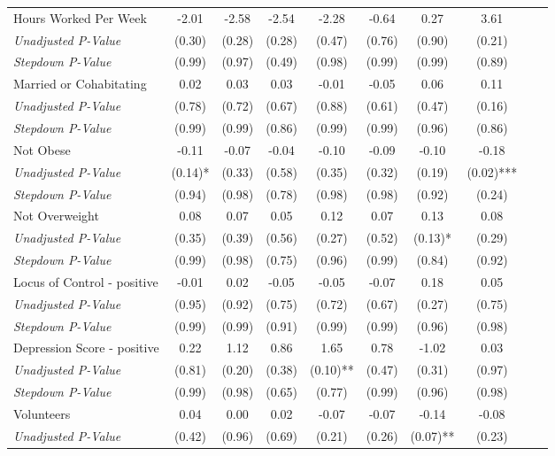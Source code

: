 \begin{tabular}{l c c c c c c c c c}
Hours Worked Per Week & -2.01 & -2.58 & -2.54 & -2.28 & -0.64 & 0.27 & 3.61 \\
\quad \textit{Unadjusted P-Value} & (0.30) & (0.28) & (0.28) & (0.47) & (0.76) & (0.90) & (0.21) \\
\quad \textit{Stepdown P-Value} & (0.99) & (0.97) & (0.49) & (0.98) & (0.99) & (0.99) & (0.89) \\
Married or Cohabitating & 0.02 & 0.03 & 0.03 & -0.01 & -0.05 & 0.06 & 0.11 \\
\quad \textit{Unadjusted P-Value} & (0.78) & (0.72) & (0.67) & (0.88) & (0.61) & (0.47) & (0.16) \\
\quad \textit{Stepdown P-Value} & (0.99) & (0.99) & (0.86) & (0.99) & (0.99) & (0.96) & (0.86) \\
Not Obese & -0.11 & -0.07 & -0.04 & -0.10 & -0.09 & -0.10 & -0.18 \\
\quad \textit{Unadjusted P-Value} & (0.14)* & (0.33) & (0.58) & (0.35) & (0.32) & (0.19) & (0.02)*** \\
\quad \textit{Stepdown P-Value} & (0.94) & (0.98) & (0.78) & (0.98) & (0.98) & (0.92) & (0.24) \\
Not Overweight & 0.08 & 0.07 & 0.05 & 0.12 & 0.07 & 0.13 & 0.08 \\
\quad \textit{Unadjusted P-Value} & (0.35) & (0.39) & (0.56) & (0.27) & (0.52) & (0.13)* & (0.29) \\
\quad \textit{Stepdown P-Value} & (0.99) & (0.98) & (0.75) & (0.96) & (0.99) & (0.84) & (0.92) \\
Locus of Control - positive & -0.01 & 0.02 & -0.05 & -0.05 & -0.07 & 0.18 & 0.05 \\
\quad \textit{Unadjusted P-Value} & (0.95) & (0.92) & (0.75) & (0.72) & (0.67) & (0.27) & (0.75) \\
\quad \textit{Stepdown P-Value} & (0.99) & (0.99) & (0.91) & (0.99) & (0.99) & (0.96) & (0.98) \\
Depression Score - positive & 0.22 & 1.12 & 0.86 & 1.65 & 0.78 & -1.02 & 0.03 \\
\quad \textit{Unadjusted P-Value} & (0.81) & (0.20) & (0.38) & (0.10)** & (0.47) & (0.31) & (0.97) \\
\quad \textit{Stepdown P-Value} & (0.99) & (0.98) & (0.65) & (0.77) & (0.99) & (0.96) & (0.98) \\
Volunteers & 0.04 & 0.00 & 0.02 & -0.07 & -0.07 & -0.14 & -0.08 \\
\quad \textit{Unadjusted P-Value} & (0.42) & (0.96) & (0.69) & (0.21) & (0.26) & (0.07)** & (0.23) \\

\end{tabular}
